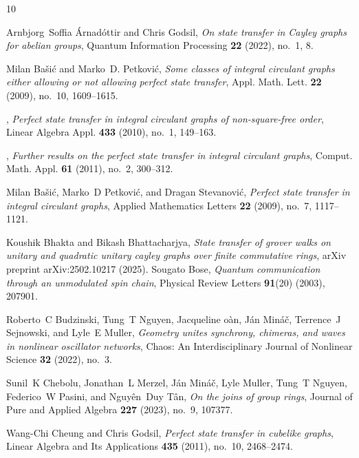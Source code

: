 \documentclass[12pt, a4paper]{amsart}
\theoremstyle{definition}
\numberwithin{equation}{section}
\begin{document}
\begin{thebibliography}{10}

Arnbj{o}rg~Soffia {\'A}rnad{\'o}ttir and Chris Godsil, \emph{On state transfer in {Cayley} graphs for abelian groups}, Quantum Information Processing \textbf{22} (2022), no.~1, 8.

Milan Ba{\v{s}}i{\'c} and Marko~D. Petkovi\'c, \emph{Some classes of integral circulant graphs either allowing or not allowing perfect state transfer}, Appl. Math. Lett. \textbf{22} (2009), no.~10, 1609--1615. 

\bysame, \emph{Perfect state transfer in integral circulant graphs of non-square-free order}, Linear Algebra Appl. \textbf{433} (2010), no.~1, 149--163. 

\bysame, \emph{Further results on the perfect state transfer in integral circulant graphs}, Comput. Math. Appl. \textbf{61} (2011), no.~2, 300--312. 

Milan Ba{\v{s}}i{\'c}, Marko~D Petkovi{\'c}, and Dragan Stevanovi{\'c}, \emph{Perfect state transfer in integral circulant graphs}, Applied Mathematics Letters \textbf{22} (2009), no.~7, 1117--1121.

Koushik Bhakta and Bikash Bhattacharjya, \emph{State transfer of grover walks on unitary and quadratic unitary cayley graphs over finite commutative rings}, arXiv preprint arXiv:2502.10217 (2025).
Sougato Bose, \emph{Quantum communication through an unmodulated spin chain}, Physical Review Letters \textbf{91}(20) (2003), 207901.

Roberto~C Budzinski, Tung~T Nguyen, Jacqueline {\DJ}o{\`a}n, J{\'a}n Min{\'a}{\v{c}}, Terrence~J Sejnowski, and Lyle~E Muller, \emph{Geometry unites synchrony, chimeras, and waves in nonlinear oscillator networks}, Chaos: An Interdisciplinary Journal of Nonlinear Science \textbf{32} (2022), no.~3.

Sunil~K Chebolu, Jonathan~L Merzel, J{\'a}n Min{\'a}{\v{c}}, Lyle Muller, Tung~T Nguyen, Federico~W Pasini, and Nguy{\^e}n~Duy T{\^a}n, \emph{On the joins of group rings}, Journal of Pure and Applied Algebra \textbf{227} (2023), no.~9, 107377.

Wang-Chi Cheung and Chris Godsil, \emph{Perfect state transfer in cubelike graphs}, Linear Algebra and Its Applications \textbf{435} (2011), no.~10, 2468--2474.


\end{thebibliography}
\end{document}
